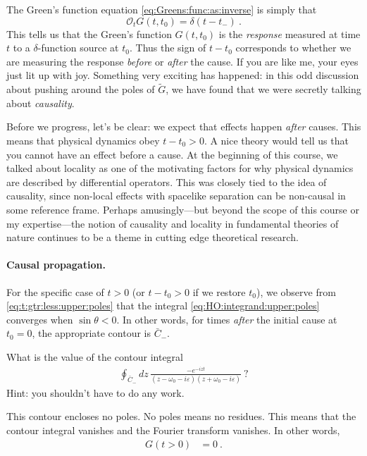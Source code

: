The Green's function equation \eqref{eq:Greens:func:as:inverse} is simply that $$\mathcal O_t G(t,t_0) = \delta(t-t_-)\ .$$ This tells us that the Green's function $G(t,t_0)$ is the \emph{response} measured at time $t$ to a $\delta$-function source at $t_0$. Thus the sign of $t-t_0$ corresponds to whether we are measuring the response \emph{before} or \emph{after} the cause. If you are like me, your eyes just lit up with joy. Something very exciting has happened: in this odd discussion about pushing around the poles of $\tilde G$, we have found that we were secretly talking about \emph{causality}.  

Before we progress, let's be clear: we expect that effects happen \emph{after} causes. This means that physical dynamics obey $t-t_0 >0$. A nice theory would tell us that you cannot have an effect before a cause. At the beginning of this course, we talked about locality as one of the motivating factors for why physical dynamics are described by differential operators. This was closely tied to the idea of causality, since non-local effects with spacelike separation can be non-causal in some reference frame. Perhaps amusingly---but beyond the scope of this course or my expertise---the notion of causality and locality in fundamental theories of nature continues to be a theme in cutting edge theoretical research. 

\paragraph{Causal propagation.}
For the specific case of $t>0$ (or $t-t_0>0$ if we restore $t_0$), we observe from \eqref{eq:t:gtr:less:upper:poles} that the integral \eqref{eq:HO:integrand:upper:poles} converges when $\sin\theta <0$. In other words, for times \emph{after} the initial cause at $t_0=0$, the appropriate contour is $\bar C_-$. 
\begin{exercise}
What is the value of the contour integral 
\begin{align}
  \oint_{\bar{C}_-} dz\, \frac{-e^{-i z t}}{(z - \omega_0 - i\varepsilon)(z + \omega_0 - i\varepsilon)} \ ?
\end{align}
Hint: you shouldn't have to do any work.
\end{exercise}
This contour encloses no poles. No poles means no residues. This means that the contour integral vanishes and the Fourier transform vanishes. In other words, 
\begin{align}
  G(t>0) &= 0 \ .
  \label{eq:HO:G:t:gtr:0:zero}
\end{align}

